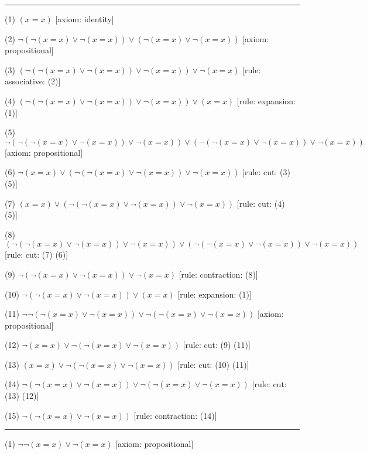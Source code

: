 \medskip
\hrule
\medskip
\item{(1)} $(x = x)$ \hfill [axiom: identity]
\item{(2)} $\neg (\neg (x = x) \lor \neg (x = x)) \lor (\neg (x = x) \lor \neg (x = x))$ \hfill [axiom: propositional]
\item{(3)} $(\neg (\neg (x = x) \lor \neg (x = x)) \lor \neg (x = x)) \lor \neg (x = x)$ \hfill [rule: associative: (2)]
\item{(4)} $(\neg (\neg (x = x) \lor \neg (x = x)) \lor \neg (x = x)) \lor (x = x)$ \hfill [rule: expansion: (1)]
\item{(5)} $\neg (\neg (\neg (x = x) \lor \neg (x = x)) \lor \neg (x = x)) \lor (\neg (\neg (x = x) \lor \neg (x = x)) \lor \neg (x = x))$ \hfill [axiom: propositional]
\item{(6)} $\neg (x = x) \lor (\neg (\neg (x = x) \lor \neg (x = x)) \lor \neg (x = x))$ \hfill [rule: cut: (3) (5)]
\item{(7)} $(x = x) \lor (\neg (\neg (x = x) \lor \neg (x = x)) \lor \neg (x = x))$ \hfill [rule: cut: (4) (5)]
\item{(8)} $(\neg (\neg (x = x) \lor \neg (x = x)) \lor \neg (x = x)) \lor (\neg (\neg (x = x) \lor \neg (x = x)) \lor \neg (x = x))$ \hfill [rule: cut: (7) (6)]
\item{(9)} $\neg (\neg (x = x) \lor \neg (x = x)) \lor \neg (x = x)$ \hfill [rule: contraction: (8)]
\item{(10)} $\neg (\neg (x = x) \lor \neg (x = x)) \lor (x = x)$ \hfill [rule: expansion: (1)]
\item{(11)} $\neg \neg (\neg (x = x) \lor \neg (x = x)) \lor \neg (\neg (x = x) \lor \neg (x = x))$ \hfill [axiom: propositional]
\item{(12)} $\neg (x = x) \lor \neg (\neg (x = x) \lor \neg (x = x))$ \hfill [rule: cut: (9) (11)]
\item{(13)} $(x = x) \lor \neg (\neg (x = x) \lor \neg (x = x))$ \hfill [rule: cut: (10) (11)]
\item{(14)} $\neg (\neg (x = x) \lor \neg (x = x)) \lor \neg (\neg (x = x) \lor \neg (x = x))$ \hfill [rule: cut: (13) (12)]
\item{(15)} $\neg (\neg (x = x) \lor \neg (x = x))$ \hfill [rule: contraction: (14)]
\medskip
\hrule
\medskip
\item{(1)} $\neg \neg (x = x) \lor \neg (x = x)$ \hfill [axiom: propositional]
